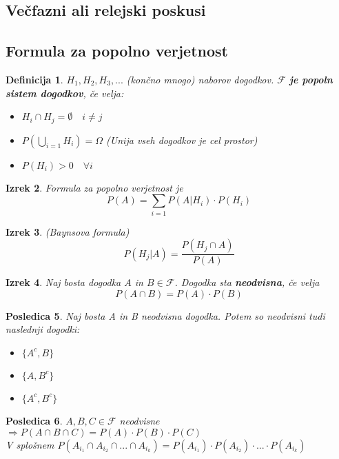 \documentclass[11pt]{article}
\newtheorem{Izrek}{{\sc Izrek}}[section]
\newtheorem{Posledica}[Izrek]{{\sc Posledica}}
\newtheorem{Definicija}[Izrek]{{\sc Definicija}}
\begin{document}
	\subsection{Večfazni ali relejski poskusi}
	\subsection{Formula za popolno verjetnost}
	\begin{Definicija}
		$H_1,H_2,H_3,...$ (končno mnogo) naborov dogodkov. $\mathcal{F}$ \textbf{je popoln sistem dogodkov}, če velja:
		\begin{itemize}
			\item
			$H_i \cap H_j = \emptyset \quad i \ne j$
			\item
			$ P(\bigcup_{i=1}H_i) = \Omega$ (Unija vseh dogodkov je cel prostor)
			\item
			$P(H_i) > 0 \quad \forall i$	
		\end{itemize}
	\end{Definicija}
	\begin{Izrek}
		Formula za popolno verjetnost je 
		$$P(A) = \sum_{i = 1}{P(A|H_i) \cdot P(H_i)}$$
	\end{Izrek}
	\begin{Izrek}(Baynsova formula)
		$$ P(H_j|A) = \frac{P(H_j\cap A)}{P(A)}$$
	\end{Izrek}
	\begin{Izrek}
		Naj bosta dogodka $A$ in $B \in \mathcal{F}$. Dogodka sta \textbf{neodvisna}, če velja $$P(A\cap B) = P(A) \cdot P(B)$$
	\end{Izrek}
	\begin{Posledica}
		Naj bosta A in B neodvisna dogodka. Potem so neodvisni tudi naslednji dogodki:
		\begin{itemize}
			\item
			$\{A^c, B\}$
			\item
			$\{A, B^c\}$
			\item
			$\{A^c, B^c\}$
		\end{itemize}
	\end{Posledica}
	\begin{Posledica}
		$A,B,C \in \mathcal{F}$ neodvisne $ \Rightarrow P(A\cap B \cap C) = P(A) \cdot P(B) \cdot P(C)$
		\\
		V splošnem $P(A_{i_1} \cap A_{i_2} \cap ...\cap A_{i_k}) = P(A_{i_1})\cdot P(A_{i_2}) \cdot ... \cdot P(A_{i_k})$
	\end{Posledica}
	
\end{document}
